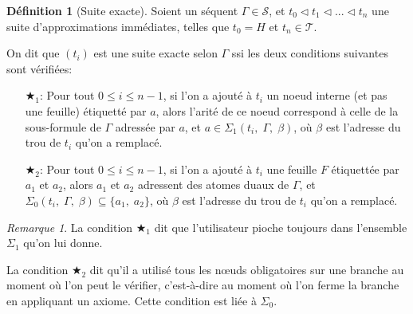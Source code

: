 \documentclass[11pt,a4paper]{article}
\theoremstyle{plain}
\theoremstyle{definition}
\newtheorem{definition}{Définition}
\theoremstyle{remark}
\newtheorem{remark}{Remarque}
\newcommand*{\sequent}{\Gamma}
\newcommand*{\sequents}{\ensuremath{\mathcal{S}}}
\newcommand*{\trees}{\ensuremath{\mathcal{T}}}
\newcommand*{\relapprox}{\ensuremath{\triangleleft}}
\newcommand*{\unknown}{H}
\newcommand*{\lowapprox}{\ensuremath{\Sigma_0}}
\newcommand*{\highapprox}{\ensuremath{\Sigma_1}}
\newcommand*{\exactcond}{\bigstar_1}
\newcommand*{\exactcondbis}{\bigstar_2}
\begin{document}
\begin{definition}[Suite exacte]
    Soient un séquent $\sequent \in \sequents$, et $t_0 \relapprox t_1 \relapprox ... \relapprox t_n$ une suite d'approximations immédiates, telles que $t_0 = \unknown$ et $t_n \in \trees$.

    On dit que $(t_i)$ est une suite exacte selon $\sequent$ ssi les deux conditions suivantes sont vérifiées:
    \begin{enumerate}
        \item[$\exactcond$:]
        Pour tout $0 \leq i \leq n-1$, si l'on a ajouté à $t_i$ un noeud interne (et pas une feuille) étiquetté par $a$, alors l'arité de ce noeud correspond à celle de la sous-formule de $\sequent$ adressée par $a$, et $a \in \highapprox(t_i, \; \sequent, \; \beta)$, où $\beta$ est l'adresse du trou de $t_i$ qu'on a remplacé.

        \item[$\exactcondbis$:]
        Pour tout $0 \leq i \leq n-1$, si l'on a ajouté à $t_i$ une feuille $F$ étiquettée par $a_1$ et $a_2$, alors $a_1$ et $a_2$ adressent des atomes duaux de $\sequent$, et $\lowapprox(t_i, \; \sequent, \; \beta) \subseteq \{a_1, \; a_2\}$, où $\beta$ est l'adresse du trou de $t_i$ qu'on a remplacé.
    \end{enumerate}
\end{definition}

\begin{remark}
    La condition $\exactcond$ dit que l'utilisateur pioche toujours dans l'ensemble $\highapprox$ qu'on lui donne.
    
    La condition $\exactcondbis$ dit qu'il a utilisé tous les n\oe uds obligatoires sur une branche au moment où l'on peut le vérifier, c'est-à-dire au moment où l'on ferme la branche en appliquant un axiome. Cette condition est liée à $\lowapprox$.
\end{remark}
\end{document}
